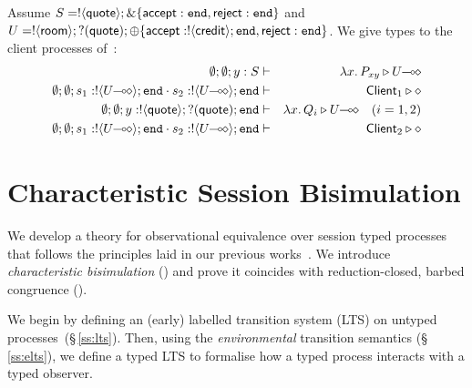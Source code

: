 \documentclass[a4paper,UKenglish]{lipics}
\theoremstyle{definition}
\begin{document}
\begin{example}\label{exam:type}
Assume $S = ! \langle \mathsf{quote} \rangle ; \& \{\mathsf{accept}: \mathtt{end}, \mathsf{reject}: \mathtt{end}\}$ and
$U = ! \langle \mathsf{room} \rangle ; ? (\mathsf{quote}) ; \oplus \{\mathsf{accept}: ! \langle \mathsf{credit} \rangle ; \mathtt{end}, \mathsf{reject}: \mathtt{end} \}$.
We give types to the client processes of~:
\begin{eqnarray*}
\es; \es; y: S & \proves &  \abs{x}{P_{xy}} \hastype \lhot{U} \\
\es; \es; s_1: \btout{\lhot{U}} \tinact \cat s_2: \btout{\lhot{U}} \tinact & \proves &  \Client_1 \hastype \Proc \\
\es; \es; y: \btout{\Quote} \btinp{\Quote} \tinact & \proves &  \abs{x}{Q_i} \hastype \lhot{U} \quad (i=1,2)\\
\es; \es; s_1: \btout{\lhot{U}} \tinact \cat s_2: \btout{\lhot{U}} \tinact & \proves &  \Client_2 \hastype \Proc
\end{eqnarray*}
\end{example}




\section{Characteristic Session Bisimulation}
\label{sec:behavioural}
 
\noi We develop a theory for observational equivalence over
session typed \HOp processes that follows the principles
laid in our previous works~\cite{KYHH2015,KY2015}.
We introduce 
\emph{characteristic bisimulation} ()
and prove
it coincides
with reduction-closed,
barbed congruence ().

We begin by defining an (early) labelled transition system (LTS) on
untyped processes~(\S\,\ref{ss:lts}). 
Then, using the \emph{environmental} transition semantics (\S\,\ref{ss:elts}), 
we define a typed LTS to formalise 
how a typed process interacts with a typed observer. 
\end{document}
